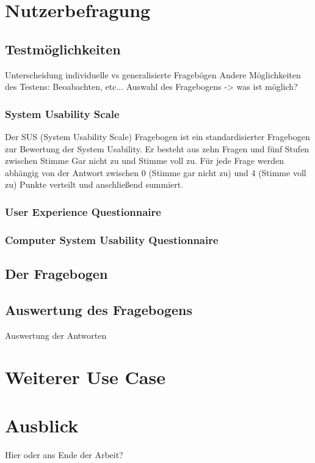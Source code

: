 \section{Nutzerbefragung}


\subsection{Testmöglichkeiten}
Unterscheidung individuelle vs generalisierte Fragebögen
Andere Möglichkeiten des Testens: Beoabachten, etc...
Auswahl des Fragebogens -> was ist möglich?

\subsubsection*{System Usability Scale}
Der SUS (System Usability Scale) Fragebogen ist ein standardisierter Fragebogen zur Bewertung der System Usability. Er besteht aus zehn Fragen und fünf Stufen zwischen Stimme Gar nicht zu und Stimme voll zu. Für jede Frage werden abhängig von der Antwort zwischen 0 (Stimme gar nicht zu) und 4 (Stimme voll zu) Punkte verteilt und anschließend summiert. 

\subsubsection*{User Experience Questionnaire}

\subsubsection*{Computer System Usability Questionnaire}

\subsection{Der Fragebogen}

\subsection{Auswertung des Fragebogens}
Auswertung der Antworten

\section{Weiterer Use Case}

\section{Ausblick}
Hier oder ans Ende der Arbeit?